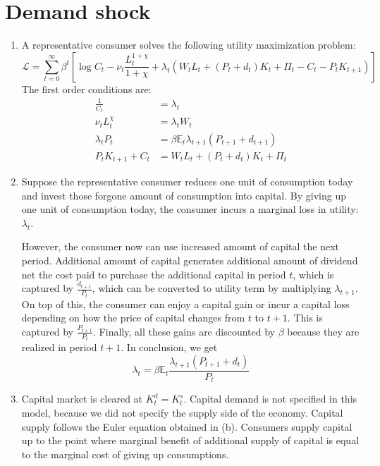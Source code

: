 \documentclass[11pt]{amsart}
\begin{document}
\section{Demand shock}
\begin{enumerate}[label=(\alph*)]
	\item A representative consumer solves the following utility maximization problem: 
	\begin{equation*}
	\mathcal{L} = \sum_{t=0}^{\infty} \beta^t \left[ \log C_t - \nu_t \frac{L_t^{1 +\chi}}{1+\chi} + \lambda_t \left( W_t L_t + (P_t + d_t) K_t + \Pi_t - C_t - P_t K_{t+1} \right) \right]
	\end{equation*}
	The first order conditions are: 
	\begin{align*}
	\frac{1}{C_t} &= \lambda_t \\
	\nu_t L_t^\chi &= \lambda_t W_t \\
	\lambda_t P_t &= \beta \mathbb{E}_t \lambda_{t+1} \left(  P_{t+1} + d_{t+1} \right)  \\
	P_t K_{t+1} + C_t & = W_t L_t + (P_t + d_t) K_t + \Pi_t
	\end{align*}
	
	\item Suppose the representative consumer reduces one unit of consumption today and invest those forgone amount of consumption into capital. By giving up one unit of consumption today, the consumer incurs a marginal loss in utility: $\lambda_t$. 
	
	However, the consumer now can use increased amount of capital the next period. Additional amount of capital generates additional amount of dividend net the cost paid to purchase the additional capital in period $t$, which is captured by $\frac{d_{t+1}}{P_t}$, which can be converted to utility term by multiplying $\lambda_{t+1}$. On top of this, the consumer can enjoy a capital gain or incur a capital loss depending on how the price of capital changes from $t$ to $t+1$. This is captured by $\frac{P_{t+1}}{P_t}$. Finally, all these gains are discounted by $\beta$ because they are realized in period $t+1$. In conclusion, we get 
	\begin{equation*}
	\lambda_t = \beta \mathbb{E}_t \frac{\lambda_{t+1} (P_{t+1} + d_t)}{P_t}
	\end{equation*}
	
	\item Capital market is cleared at $K_t^d = K_t^s$. Capital demand is not specified in this model, because we did not specify the supply side of the economy. Capital supply follows the Euler equation obtained in (b). Consumers supply capital up to the point where marginal benefit of additional supply of capital is equal to the marginal cost of giving up consumptions. 
	

\end{enumerate}
\end{document}
